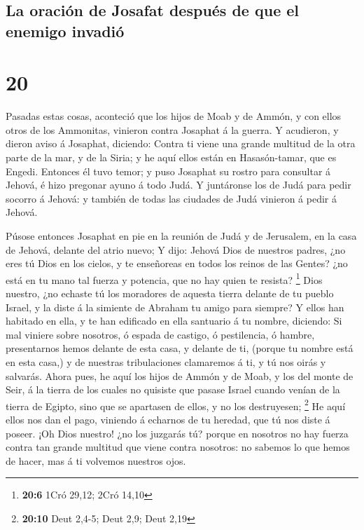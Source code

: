 \hypertarget{la-oraciuxf3n-de-josafat-despuuxe9s-de-que-el-enemigo-invadiuxf3}{%
\subsection{La oración de Josafat después de que el enemigo
invadió}\label{la-oraciuxf3n-de-josafat-despuuxe9s-de-que-el-enemigo-invadiuxf3}}

\hypertarget{section-19}{%
\section{20}\label{section-19}}

 Pasadas estas cosas, aconteció que los hijos de Moab y de
Ammón, y con ellos otros de los Ammonitas, vinieron contra Josaphat á la
guerra.  Y acudieron, y dieron aviso á Josaphat, diciendo:
Contra ti viene una grande multitud de la otra parte de la mar, y de la
Siria; y he aquí ellos están en Hasasón-tamar, que es Engedi.
 Entonces él tuvo temor; y puso Josaphat su rostro para
consultar á Jehová, é hizo pregonar ayuno á todo Judá.  Y
juntáronse los de Judá para pedir socorro á Jehová: y también de todas
las ciudades de Judá vinieron á pedir á Jehová.

 Púsose entonces Josaphat en pie en la reunión de Judá y de
Jerusalem, en la casa de Jehová, delante del atrio nuevo;  Y
dijo: Jehová Dios de nuestros padres, ¿no eres tú Dios en los cielos, y
te enseñoreas en todos los reinos de las Gentes? ¿no está en tu mano tal
fuerza y potencia, que no hay quien te resista? \footnote{\textbf{20:6}
  1Cró 29,12; 2Cró 14,10}  Dios nuestro, ¿no echaste tú los
moradores de aquesta tierra delante de tu pueblo Israel, y la diste á la
simiente de Abraham tu amigo para siempre?  Y ellos han
habitado en ella, y te han edificado en ella santuario á tu nombre,
diciendo:  Si mal viniere sobre nosotros, ó espada de
castigo, ó pestilencia, ó hambre, presentarnos hemos delante de esta
casa, y delante de ti, (porque tu nombre está en esta casa,) y de
nuestras tribulaciones clamaremos á ti, y tú nos oirás y salvarás.
 Ahora pues, he aquí los hijos de Ammón y de Moab, y los
del monte de Seir, á la tierra de los cuales no quisiste que pasase
Israel cuando venían de la tierra de Egipto, sino que se apartasen de
ellos, y no los destruyesen; \footnote{\textbf{20:10} Deut 2,4-5; Deut
  2,9; Deut 2,19}  He aquí ellos nos dan el pago, viniendo
á echarnos de tu heredad, que tú nos diste á poseer.  ¡Oh
Dios nuestro! ¿no los juzgarás tú? porque en nosotros no hay fuerza
contra tan grande multitud que viene contra nosotros: no sabemos lo que
hemos de hacer, mas á ti volvemos nuestros ojos.

